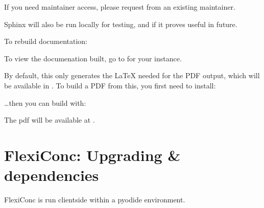 \documentclass[letterpaper,10pt,english]{sphinxmanual}
\begin{document}
\sphinxAtStartPar
If you need maintainer access, please request from an existing maintainer.

\sphinxAtStartPar
Sphinx will also be run locally for testing, and if it proves useful in future.

\sphinxAtStartPar
To re\sphinxhyphen{}build documentation:

\begin{sphinxVerbatim}[commandchars=\\\{\}]
  
\end{sphinxVerbatim}

\sphinxAtStartPar
To view the documenation built, go to  for your instance.

\sphinxAtStartPar
By default, this only generates the LaTeX needed for the PDF output, which will
be available in . To build a PDF from
this, you first need to install:

\begin{sphinxVerbatim}[commandchars=\\\{\}]
   \PYGZbs{}
             \PYGZbs{}
             \PYGZbs{}
\end{sphinxVerbatim}

\sphinxAtStartPar
…then you can build with:

\begin{sphinxVerbatim}[commandchars=\\\{\}]
   
\end{sphinxVerbatim}

\sphinxAtStartPar
The pdf will be available at .


\section{FlexiConc: Upgrading \& dependencies}
\label{\detokenize{advanced/development:flexiconc-upgrading-dependencies}}
\sphinxAtStartPar
FlexiConc is run client\sphinxhyphen{}side within a pyodide environment.
\end{document}

